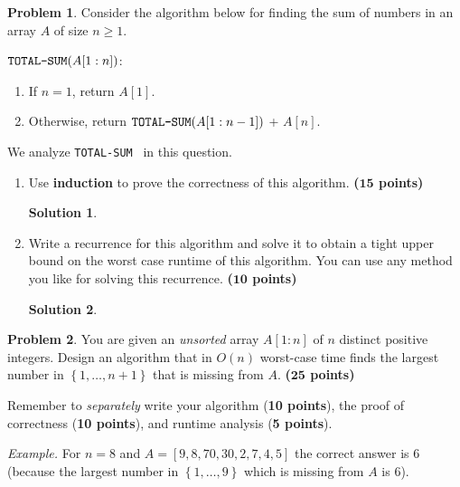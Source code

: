 \documentclass{article}
\theoremstyle{definition}
\newtheorem{problem}{Problem}
\newtheorem*{solution*}{Solution}
\newenvironment{solution}{\begin{solution*}}{{} \end{solution*}}
\newcommand{\grade}[1]{\hfill{\textbf{($\mathbf{#1}$ points)}}}
\newcommand{\set}[1]{\ensuremath{\left\{ #1 \right\}}}
\newcommand{\totalsum}{\textnormal{\texttt{TOTAL-SUM}}}
\begin{document}
\newpage


\begin{problem}\label{induction}
	Consider the algorithm below for finding the sum of numbers in an array $A$ of size $n \geq 1$.  
	
	\medskip
	
	$\totalsum (A[1:n])$: \vspace{-0.4cm}
	\medskip
	\begin{enumerate}
		\item If $n=1$, return $A[1]$. 
		\item Otherwise, return $\totalsum(A[1:n-1])$ + $A[n]$. 
	\end{enumerate}

	We analyze \totalsum~ in this question. 
	\begin{enumerate}[label=(\alph*)]
		\item Use \textbf{induction} to prove the correctness of this algorithm. \grade{15}
		
		
\smallskip
\begin{solution}
\end{solution}
		\newpage
		\item Write a recurrence for this algorithm and solve it to obtain a tight upper bound on the worst case runtime of this algorithm. You can use any method you like for solving this recurrence. 		\grade{10}
		
		
\smallskip
\begin{solution}
\end{solution}

	\end{enumerate}
\end{problem} 

\newpage

\begin{problem}\label{sort}
	You are given an \emph{unsorted} array $A[1:n]$ of $n$ distinct positive integers. Design an algorithm that in $O(n)$ worst-case time finds the largest number in $\set{1,\ldots,n+1}$ that is missing from $A$. 
	\grade{25}
	
	Remember to \emph{separately} write your algorithm (\textbf{10 points}), the proof of correctness (\textbf{10 points}), and runtime analysis (\textbf{5 points}). 
	
	\medskip
	\emph{Example.} For $n=8$ and $A=[9,8,70,30,2,7,4,5]$ the correct answer is $6$ (because the largest number in $\set{1,\ldots,9}$ which is missing from $A$ is $6$). 

\end{problem}
\end{document}
